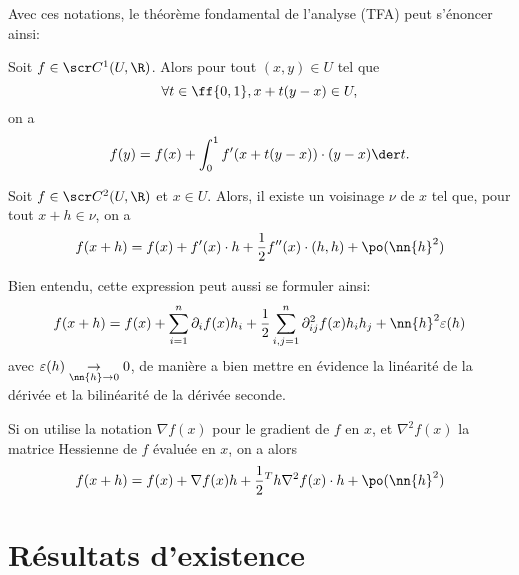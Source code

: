 Avec ces notations, le théorème fondamental de l'analyse (TFA) peut s'énoncer ainsi:

\begin{thm}
    Soit \(f\in \scr C^1(U, \R)\). Alors pour tout \((x,y)\in U\) tel que
    \begin{equation*}
        \forall t\in \ff{0,1}, x +t(y-x)\in U,
    \end{equation*}
    on a
    \begin{equation*}
        f(y) = f(x) + \int_0^1 f'(x+ t(y-x))\cdot(y-x)\der t.
    \end{equation*}
\end{thm}

\begin{fmdt}
    Soit \(f\in \scr C^2(U, \R)\) et \(x\in U\). Alors, il existe un voisinage
    \(\nu\) de \(x\) tel que, pour tout \(x+h\in\nu\), on a
    \begin{equation*}
        f(x+h) = f(x) + f'(x)\cdot h + \frac12 f''(x)\cdot(h,h) + \po(\nn{h}^2)
    \end{equation*}

    Bien entendu, cette expression peut aussi se formuler ainsi:
    \begin{equation*}
        \begin{aligned}
            f(x+h) = f(x) + \sum_{i=1}^n \partial_i f(x) h_i + \frac12 \sum_{i,j=1}^n \partial^2_{ij} f(x) h_i h_j + \nn{h}^2 \varepsilon(h)
        \end{aligned}
    \end{equation*}
    avec \(\varepsilon(h) \underset{\nn{h}\to 0}{\to} 0\), 
    de manière a bien mettre en évidence la linéarité de la dérivée et
    la bilinéarité de la dérivée seconde.

    Si on utilise la notation \(\nabla f(x)\) pour le gradient de \(f\) en \(x\),
    et \(\nabla^2 f(x)\) la matrice Hessienne de \(f\) évaluée en \(x\), on 
    a alors
    \begin{equation*}
        f(x+h) = f(x) + \nabla f(x)h + \frac 12 {}^T h\nabla^2 f(x)\cdot h + \po(\nn{h}^2)
    \end{equation*}

\end{fmdt}


\section{Résultats d'existence}


